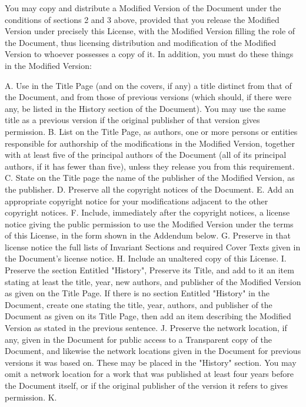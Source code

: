\documentclass{book}
\begin{document}
You may copy and distribute a Modified Version of the Document under
the conditions of sections 2 and 3 above, provided that you release
the Modified Version under precisely this License, with the Modified
Version filling the role of the Document, thus licensing distribution
and modification of the Modified Version to whoever possesses a copy
of it. In addition, you must do these things in the Modified Version:

A. Use in the Title Page (and on the covers, if any) a title distinct
from that of the Document, and from those of previous versions (which
should, if there were any, be listed in the History section of the
Document). You may use the same title as a previous version if the
original publisher of that version gives permission.  B. List on the
Title Page, as authors, one or more persons or entities responsible
for authorship of the modifications in the Modified Version, together
with at least five of the principal authors of the Document (all of
its principal authors, if it has fewer than five), unless they release
you from this requirement.  C. State on the Title page the name of the
publisher of the Modified Version, as the publisher.  D. Preserve all
the copyright notices of the Document.  E. Add an appropriate
copyright notice for your modifications adjacent to the other
copyright notices.  F. Include, immediately after the copyright
notices, a license notice giving the public permission to use the
Modified Version under the terms of this License, in the form shown in
the Addendum below.  G. Preserve in that license notice the full lists
of Invariant Sections and required Cover Texts given in the Document's
license notice.  H. Include an unaltered copy of this License.  I.
Preserve the section Entitled "History", Preserve its Title, and add
to it an item stating at least the title, year, new authors, and
publisher of the Modified Version as given on the Title Page. If there
is no section Entitled "History" in the Document, create one stating
the title, year, authors, and publisher of the Document as given on
its Title Page, then add an item describing the Modified Version as
stated in the previous sentence.  J. Preserve the network location, if
any, given in the Document for public access to a Transparent copy of
the Document, and likewise the network locations given in the Document
for previous versions it was based on. These may be placed in the
"History" section. You may omit a network location for a work that was
published at least four years before the Document itself, or if the
original publisher of the version it refers to gives permission.  K.
\end{document}
